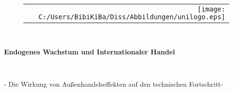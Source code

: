 \documentclass[12pt, xcolor=dvipsnames]{report}
\begin{document}
{}
\thispagestyle{empty}

\begin{center}

\begin{figure}[h!]
 \vspace{-2.8cm}\centering 
  \begin{tabular}{@{}r@{}} 

\texttt{[image: C:/Users/BibiKiBa/Diss/Abbildungen/unilogo.eps]}\\
  \end{tabular}  
	\label{unilogo}
\end{figure}
\hline{}\\[0.5cm]
 	\begin{Huge} 
	\centering \textbf{Endogenes Wachstum und Internationaler Handel}
	
 	\end{Huge} {}\\[1cm]
 	\begin{large} 
 - Die Wirkung von Au{\ss}enhandelseffekten auf den technischen Fortschritt-\\[0.5cm]
	\end{large}
 \hline
{}\\[1.5cm]
\centering




\end{center}
\end{document}
